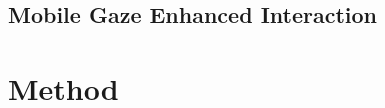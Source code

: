 \documentclass[jou,a4paper,notxfonts]{apa}
\begin{document}
\subsection{Mobile Gaze Enhanced Interaction}



\section{Method}
\end{document}
